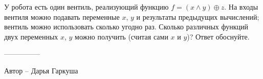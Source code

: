 \question
У робота есть один вентиль, реализующий функцию $f=(x\wedge y)\oplus z$. На входы вентиля можно подавать переменные $x$, $y$ и результаты предыдущих вычислений; вентиль можно использовать сколько угодно раз. Сколько различных функций двух переменных $x$, $y$ можно получить (считая сами $x$ и $y$)? Ответ обоснуйте.

---------------

Автор -- Дарья Гаркуша